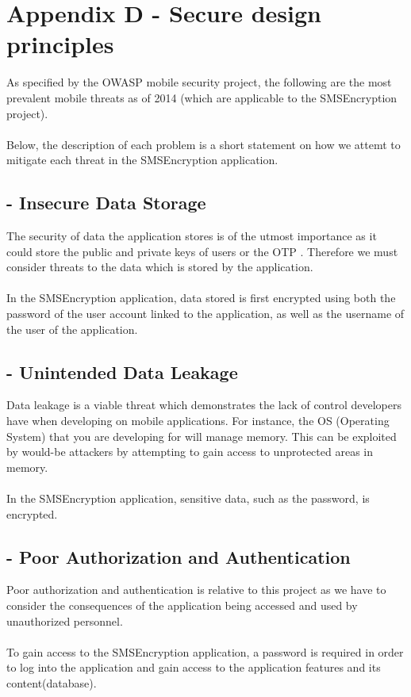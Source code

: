 \section{Appendix D - Secure design principles}
As specified by the OWASP mobile security project, the following are the most prevalent mobile threats as of 2014 (which are applicable to the SMSEncryption project).\\
\textbf{\\}
Below, the description of each problem is a short statement on how we attemt to mitigate each threat in the SMSEncryption application.
\subsection*{ - Insecure Data Storage}
The security of data the application stores is of the utmost importance as it could store the public and private keys of users or the OTP . Therefore we must consider threats to the data which is stored by the application. \\
\textbf{\\}
In the SMSEncryption application, data stored is first encrypted using both the password of the user account linked to the application, as well as the username of the user of the application.
\subsection*{ - Unintended Data Leakage}
Data leakage is a viable threat which demonstrates the lack of control developers have when developing on mobile applications. For instance, the OS (Operating System) that you are developing for will manage memory. This can be exploited by would-be attackers by attempting to gain access to unprotected areas in memory.\\
\textbf{\\}
In the SMSEncryption application, sensitive data, such as the password, is encrypted.
\subsection*{ - Poor Authorization and Authentication}
Poor authorization and authentication is relative to this project as we have to consider the consequences of the application being accessed and used by unauthorized personnel.\\
\textbf{\\}
To gain access to the SMSEncryption application, a password is required in order to log into the application and gain access to the application features and its content(database).
